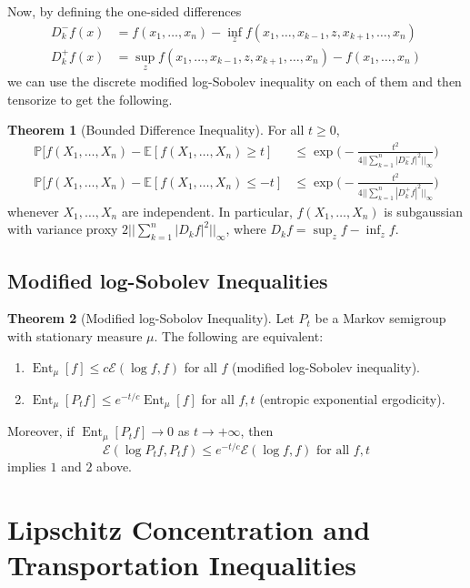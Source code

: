 \documentclass{article}
\DeclareMathOperator{\Ent}{Ent}
\theoremstyle{definition}
\newtheorem{theorem}{Theorem}[section]
\theoremstyle{remark}
\theoremstyle{definition}
\begin{document}
Now, by defining the one-sided differences 
\begin{align*}
    D_k^- f (x) & = f(x_1, \ldots, x_n) - \inf_z f (x_1, \ldots, x_{k-1}, z, x_{k+1}, \ldots, x_n) \\
    D_k^+ f (x) & = \sup_z f (x_1, \ldots, x_{k-1}, z, x_{k+1}, \ldots, x_n) - f(x_1, \ldots, x_n) 
\end{align*}
we can use the discrete modified log-Sobolev inequality on each of them and then tensorize to get the following. 

\begin{theorem}[Bounded Difference Inequality]
For all $t \geq 0$, 
\begin{align*}
    \mathbb{P}[ f(X_1, \ldots, X_n) - \mathbb{E}[f(X_1, \ldots, X_n) \geq t] & \leq \exp \bigg( -\frac{t^2}{4 || \sum_{k=1}^n |D_k^- f|^2||_\infty} \bigg) \\
    \mathbb{P}[ f(X_1, \ldots, X_n) - \mathbb{E}[f(X_1, \ldots, X_n) \leq -t] & \leq \exp \bigg( -\frac{t^2}{4 || \sum_{k=1}^n |D_k^+ f|^2||_\infty} \bigg) 
\end{align*}
whenever $X_1, \ldots, X_n$ are independent. In particular, $f(X_1, \ldots, X_n)$ is subgaussian with variance proxy $2 ||\sum_{k=1}^n |D_k f|^2 ||_\infty$, where $D_k f = \sup_z f - \inf_z f$. 
\end{theorem}

\subsection{Modified log-Sobolev Inequalities}

\begin{theorem}[Modified log-Sobolov Inequality]
Let $P_t$ be a Markov semigroup with stationary measure $\mu$. The following are equivalent: 
\begin{enumerate}
    \item $\Ent_\mu [f] \leq c \mathcal{E}(\log f, f)$ for all $f$ (modified log-Sobolev inequality). 
    \item $\Ent_\mu [P_t f] \leq e^{-t/c} \Ent_\mu [f]$ for all $f, t$ (entropic exponential ergodicity). 
\end{enumerate}
Moreover, if $\Ent_\mu [P_t f] \rightarrow 0$ as $t \rightarrow +\infty$, then 
\[\mathcal{E}(\log P_t f, P_t f) \leq e^{-t/c} \mathcal{E}(\log f, f) \text{ for all } f, t\]
implies $1$ and $2$ above. 
\end{theorem}


\section{Lipschitz Concentration and Transportation Inequalities}
\end{document}
